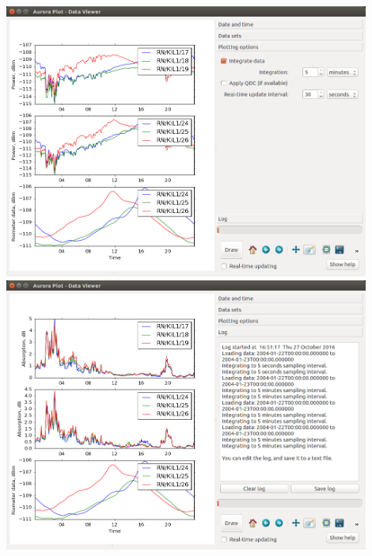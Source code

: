 \documentclass{article}
\begin{document}
\includegraphics[width=12cm]{images/dv-6.png}
\includegraphics[width=12cm]{images/dv-7.png}
\end{document}
